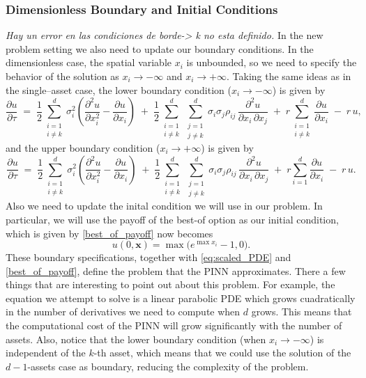 \documentclass[12pt]{report} %
\theoremstyle{plain}           %
\theoremstyle{definition}      %
\theoremstyle{remark}          %
\begin{document}
\subsubsection{Dimensionless Boundary and Initial Conditions}
\textit{Hay un error en las condiciones de borde-> k no esta definido.}
In the new problem setting we also need to update our boundary conditions. In the dimensionless 
case, the spatial variable $x_i$ is unbounded, so we need to specify the behavior 
of the solution as $x_i\to-\infty$ and $x_i\to+\infty$. Taking the same ideas as in 
the single–asset case, the lower boundary condition ($x_i \to -\infty$) is given by
\begin{equation}
	\frac{\partial u}{\partial \tau} \;=\;
	\frac{1}{2}\sum_{\substack{i=1 \\ i\neq k}}^d 
	\sigma_i^{2}\!\left(
	\frac{\partial^{2}u}{\partial x_i^{2}}
	-\frac{\partial u}{\partial x_i}\right)
	\;+\;
	\frac{1}{2}\sum_{\substack{i=1 \\ i\neq k}}^d
		\sum_{\substack{j=1 \\ j\neq k}}^d
	\sigma_i\sigma_j\rho_{ij}\,
	\frac{\partial^{2}u}{\partial x_i\,\partial x_j}
	\;+\;
	r\sum_{\substack{i=1 \\ i\neq k}}^d
	\frac{\partial u}{\partial x_i}
	\;-\;
	r\,u ,
  \label{eq:boundary_multi_1}
\end{equation}
and the upper boundary condition ($x_i \to +\infty$) is given by
\begin{equation}
	\frac{\partial u}{\partial \tau} \;=\;
	\frac{1}{2}\sum_{\substack{i=1 \\ i\neq k}}^d 
	\sigma_i^{2}\!\left(
	\frac{\partial^{2}u}{\partial x_i^{2}}
	-\frac{\partial u}{\partial x_i}\right)
	\;+\;
	\frac{1}{2}\sum_{\substack{i=1 \\ i\neq k}}^d
		\sum_{\substack{j=1 \\ j\neq k}}^d
	\sigma_i\sigma_j\rho_{ij}\,
	\frac{\partial^{2}u}{\partial x_i\,\partial x_j}
	\;+\;
	r\sum_{i=1}^d\frac{\partial u}{\partial x_i}
	\;-\;
	r\,u .
  \label{eq:boundary_multi_2}
\end{equation}
Also we need to update the inital condition we will use in our problem. 
In particular, we will use the payoff of the best-of option as our 
initial condition, which is given by \eqref{best_of_payoff} now becomes
\begin{equation}
	u(0,\mathbf{x})=\max\bigl(e^{\max x_i}-1,0\bigr).
	\label{eq:terminal_multi}
\end{equation}
These boundary specifications, together with \eqref{eq:scaled_PDE} and \eqref{best_of_payoff}, define 
the problem that the PINN approximates. 
There a few things that are interesting to point out about this problem. For example, the equation we attempt to solve is a linear parabolic PDE which grows cuadratically
in the number of derivatives we need to compute when $d$ grows. This means that the computational cost of the PINN will grow significantly with the number of assets.
Also, notice that the lower boundary condition (when $x_i\to-\infty$) is independent of the $k$-th asset, which means that we could
use the solution of the $d-1$-assets case as boundary, reducing the complexity of the problem.
\end{document}
